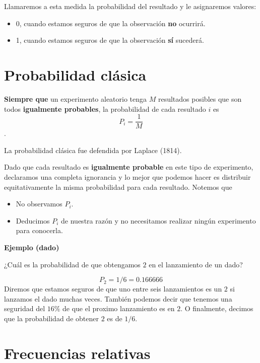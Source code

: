 \documentclass[
]{book}
\providecommand{\tightlist}{%
  \setlength{\itemsep}{0pt}\setlength{\parskip}{0pt}}
\begin{document}
Llamaremos a esta medida la probabilidad del resultado y le asignaremos valores:

\begin{itemize}
\item
  0, cuando estamos seguros de que la observación \textbf{no} ocurrirá.
\item
  1, cuando estamos seguros de que la observación \textbf{sí} sucederá.
\end{itemize}

\hypertarget{probabilidad-cluxe1sica}{%
\section{Probabilidad clásica}\label{probabilidad-cluxe1sica}}

\textbf{Siempre que} un experimento aleatorio tenga \(M\) resultados posibles que son todos \textbf{igualmente probables}, la probabilidad de cada resultado \(i\) es \[P_i=\frac{1}{M}\].

La probabilidad clásica fue defendida por Laplace (1814).

Dado que cada resultado es \textbf{igualmente probable} en este tipo de experimento, declaramos una completa ignorancia y lo mejor que podemos hacer es distribuir equitativamente la misma probabilidad para cada resultado. Notemos que

\begin{itemize}
\tightlist
\item
  No observamos \(P_i\).
\item
  Deducimos \(P_i\) de nuestra razón y no necesitamos realizar ningún experimento para conocerla.
\end{itemize}

\textbf{Ejemplo (dado)}

¿Cuál es la probabilidad de que obtengamos \(2\) en el lanzamiento de un dado?

\[P_2=1/6=0.166666\]
Diremos que estamos seguros de que uno entre seis lanzamientos es un \(2\) si lanzamos el dado muchas veces. También podemos decir que tenemos una seguridad del \(16\%\) de que el pr\textquotesingle oximo lanzamiento es en \(2\). O finalmente, decimos que la probabilidad de obtener \(2\) es de \(1/6\).

\hypertarget{frecuencias-relativas-1}{%
\section{Frecuencias relativas}\label{frecuencias-relativas-1}}
\end{document}
